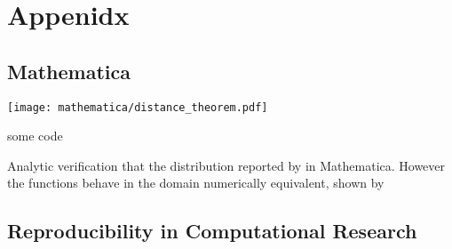 
\chapter{Appenidx}

\section{Mathematica}

\begin{mathematica}[h!]
\texttt{[image: mathematica/distance\_theorem.pdf]}
\caption{some code}
\label{mathematica:distances}
\end{mathematica} 

\begin{remark} Analytic verification that the distribution reported by
  \textcite{Moltchanov2012} in Mathematica.
However the functions behave in the domain numerically equivalent,
shown by 
\end{remark}




\section{Reproducibility in Computational Research}\label{sec:reproducibility}

\textcite{Sumatra2012}







